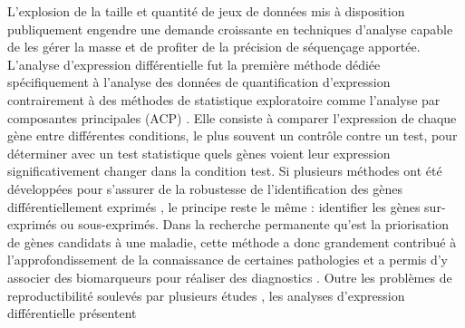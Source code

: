 L'explosion de la taille et quantité de jeux de données mis à disposition publiquement engendre une demande croissante en techniques d'analyse capable de les gérer la masse et de profiter de la précision de séquençage apportée. 
L'analyse d'expression différentielle fut la première méthode dédiée spécifiquement à l'analyse des données de quantification d'expression contrairement à des méthodes de statistique exploratoire comme l'analyse par composantes principales (ACP) \cite{deKok2005Jan}. Elle consiste à comparer l'expression de chaque gène entre différentes conditions, le plus souvent un contrôle contre un test, pour déterminer avec un test statistique quels gènes voient leur expression significativement changer dans la condition test. Si plusieurs méthodes ont été développées pour s'assurer de la robustesse de l'identification des gènes différentiellement exprimés \cite{Soneson2013Dec,Spies2019Jan}, le principe reste le même : identifier les gènes sur-exprimés ou sous-exprimés. Dans la recherche permanente qu'est la priorisation de gènes candidats à une maladie, cette méthode a donc grandement contribué à l'approfondissement de la connaissance de certaines pathologies et a permis d'y associer des biomarqueurs pour réaliser des diagnostics \cite{Costa-Silva2017Dec}. Outre les problèmes de reproductibilité soulevés par plusieurs études \cite{Ostlund2014}, les analyses d'expression différentielle présentent 
